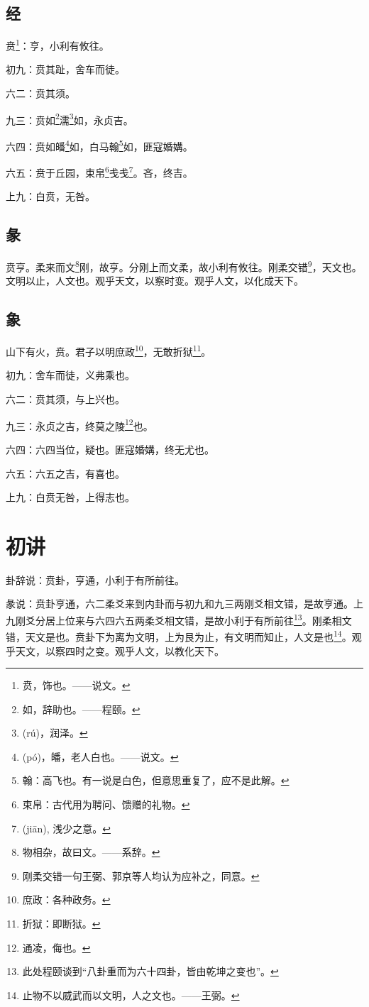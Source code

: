 \documentclass[12pt,oneside]{book}
\begin{document}
\subsection{经}
贲\footnote{贲，饰也。——说文。}：亨，小利有攸往。

初九：贲其趾，舍车而徒。

六二：贲其须。

九三：贲如\footnote{如，辞助也。——程颐。}濡\footnote{(rú)，润泽。}如，永贞吉。

六四：贲如皤\footnote{(pó)，皤，老人白也。——说文。}如，白马翰\footnote{翰：高飞也。有一说是白色，但意思重复了，应不是此解。}如，匪寇婚媾。

六五：贲于丘园，束帛\footnote{束帛：古代用为聘问、馈赠的礼物。}戋戋\footnote{(jiān), 浅少之意。}。吝，终吉。

上九：白贲，无咎。

\subsection{彖}
贲亨。柔来而文\footnote{物相杂，故曰文。——系辞。}刚，故亨。分刚上而文柔，故小利有攸往。刚柔交错\footnote{刚柔交错一句王弼、郭京等人均认为应补之，同意。}，天文也。文明以止，人文也。观乎天文，以察时变。观乎人文，以化成天下。

\subsection{象}
山下有火，贲。君子以明庶政\footnote{庶政：各种政务。}，无敢折狱\footnote{折狱：即断狱。}。

初九：舍车而徒，义弗乘也。

六二：贲其须，与上兴也。

九三：永贞之吉，终莫之陵\footnote{通凌，侮也。}也。

六四：六四当位，疑也。匪寇婚媾，终无尤也。

六五：六五之吉，有喜也。

上九：白贲无咎，上得志也。


\section{初讲}
卦辞说：贲卦，亨通，小利于有所前往。

彖说：贲卦亨通，六二柔爻来到内卦而与初九和九三两刚爻相文错，是故亨通。上九刚爻分居上位来与六四六五两柔爻相文错，是故小利于有所前往\footnote{此处程颐谈到“八卦重而为六十四卦，皆由乾坤之变也”。}。刚柔相文错，天文是也。贲卦下为离为文明，上为艮为止，有文明而知止，人文是也\footnote{止物不以威武而以文明，人之文也。——王弼。}。观乎天文，以察四时之变。观乎人文，以教化天下。
\end{document}
